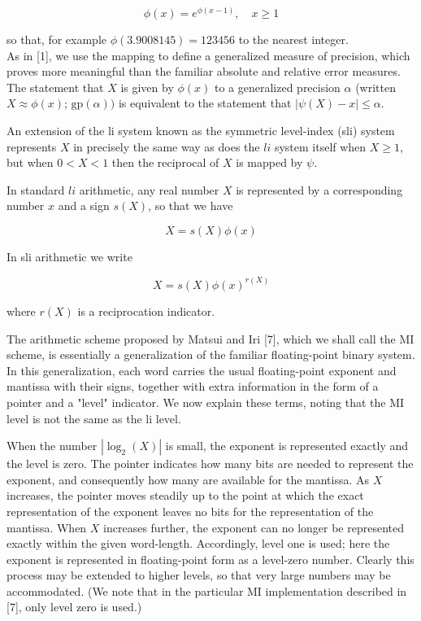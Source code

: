 \documentclass[10pt]{article}
\begin{document}
\begin{equation*}
\phi(x)=e^{\phi(x-1)}, \quad x \geq 1 \tag{2.4}
\end{equation*}


so that, for example $\phi(3.9008145)=123456$ to the nearest integer.\\[0pt]
As in [1], we use the mapping to define a generalized measure of precision, which proves more meaningful than the familiar absolute and relative error measures. The statement that $X$ is given by $\phi(x)$ to a generalized precision $\alpha$ (written $X \approx \phi(x)$; $\mathrm{gp}(\alpha))$ is equivalent to the statement that $|\psi(X)-x| \leq \alpha$.

An extension of the li system known as the symmetric level-index (sli) system represents $X$ in precisely the same way as does the $l i$ system itself when $X \geq 1$, but when $0<X<1$ then the reciprocal of $X$ is mapped by $\psi$.

In standard $l i$ arithmetic, any real number $X$ is represented by a corresponding number $x$ and a sign $s(X)$, so that we have


\begin{equation*}
X=s(X) \phi(x) \tag{2.5}
\end{equation*}


In sli arithmetic we write


\begin{equation*}
X=s(X) \phi(x)^{r(X)} \tag{2.6}
\end{equation*}


where $r(X)$ is a reciprocation indicator.

The arithmetic scheme proposed by Matsui and Iri [7], which we shall call the MI scheme, is essentially a generalization of the familiar floating-point binary system. In this generalization, each word carries the usual floating-point exponent and mantissa with their signs, together with extra information in the form of a pointer and a "level" indicator. We now explain these terms, noting that the MI level is not the same as the li level.

When the number $\left|\log _{2}(X)\right|$ is small, the exponent is represented exactly and the level is zero. The pointer indicates how many bits are needed to represent the exponent, and consequently how many are available for the mantissa. As $X$ increases, the pointer moves steadily up to the point at which the exact representation of the exponent leaves no bits for the representation of the mantissa. When $X$ increases further, the exponent can no longer be represented exactly within the given word-length. Accordingly, level one is used; here the exponent is represented in floating-point form as a level-zero number. Clearly this process may be extended to higher levels, so that very large numbers may be accommodated. (We note that in the particular MI implementation described in [7], only level zero is used.)
\end{document}
